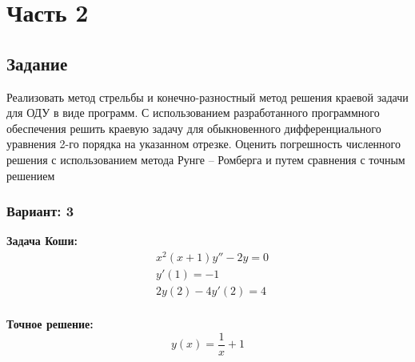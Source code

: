 
\chapter*{Часть 2}

\section*{Задание}
Реализовать метод стрельбы и конечно-разностный метод решения краевой
задачи для ОДУ в виде программ. С использованием разработанного
программного обеспечения решить краевую задачу для обыкновенного
дифференциального уравнения 2-го порядка на указанном отрезке.
Оценить погрешность численного решения с использованием метода
Рунге – Ромберга и путем сравнения с точным решением
\subsection*{Вариант: 3}

\textbf{Задача Коши:}
\begin{equation*}\begin{aligned}
    & x^2(x+1) y''-2y=0 \\
    & y'(1)= -1 \\
    & 2y(2) - 4 y'(2) =4 \\
\end{aligned}
\end{equation*}

\textbf{Точное решение:}
\begin{equation*}
    y(x) = \frac{1}{x} + 1
\end{equation*}

\pagebreak
